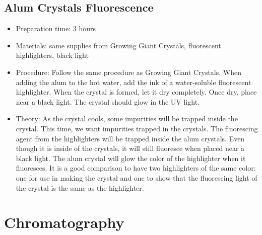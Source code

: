 \subsection{Alum Crystals Fluorescence}
\begin{itemize}
\item{Preparation time: 3 hours}
\item{Materials: same supplies from Growing Giant Crystals, fluorescent highlighters, black light}
\item{Procedure: Follow the same procedure as Growing Giant Crystals. When adding the alum to the hot water, add the ink of a water-soluble fluorescent highlighter. When the crystal is formed, let it dry completely. Once dry, place near a black light. The crystal should glow in the UV light.}
\item{Theory: As the crystal cools, some impurities will be trapped inside the crystal. This time, we want impurities trapped in the crystals. The fluorescing agent from the highlighters will be trapped inside the alum crystals. Even though it is inside of the crystals, it will still fluoresce when placed near a black light. The alum crystal will glow the color of the highlighter when it fluoresces. It is a good comparison to have two highlighters of the same color: one for use in making the crystal and one to show that the fluorescing light of the crystal is the same as the highlighter.}
\end{itemize}

\section{Chromatography}

